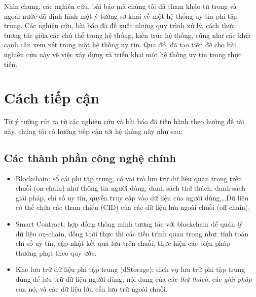 Nhìn chung, các nghiên cứu, bài báo mà chúng tôi đã tham khảo từ trong và ngoài nước đã định hình một ý tưởng sơ khai về một hệ thống uy tín phi tập trung. Các nghiên cứu, bài báo đã đề xuất những quy trình xử lý, cách thức tương tác giữa các chủ thể trong hệ thống, kiến trúc hệ thống, cũng như các khía cạnh cần xem xét trong một hệ thống uy tín. Qua đó, đã tạo tiền đề cho bài nghiên cứu này về việc xây dựng và triển khai một hệ thống uy tín trong thực tiễn.

\section{Cách tiếp cận}

Từ ý tưởng rút ra từ các nghiên cứu và bài báo đã tiến hành theo hướng đề tài này, chúng tôi có hướng tiếp cận tới hệ thống này như sau:

\subsection{Các thành phần công nghệ chính}
\begin{itemize}
  \item Blockchain: sổ cái phi tập trung, có vai trò lưu trữ dữ liệu quan trọng trên chuỗi (on-chain) như thông tin người dùng, danh sách thử thách, danh sách giải pháp, chỉ số uy tín, quyền truy cập vào dữ liệu của người dùng,\dots Dữ liệu có thể chứa các tham chiếu (CID) của các dữ liệu lưu ngoài chuỗi (off-chain).
  \item Smart Contract: hợp đồng thông minh tương tác với blockchain để quản lý dữ liệu on-chain, đồng thời thực thi các tiến trình quan trọng như: tính toán chỉ số uy tín, cập nhật kết quả lưu trên chuỗi, thực hiện các biện pháp thưởng phạt theo quy ước.
  \item Kho lưu trữ dữ liệu phi tập trung (dStorage): dịch vụ lưu trữ phi tập trung dùng để lưu trữ dữ liệu người dùng, nội dung của các \textit{thử thách}, các \textit{giải pháp} của nó, và các dữ liệu lớn cần lưu trữ ngoài chuỗi.
\end{itemize}

